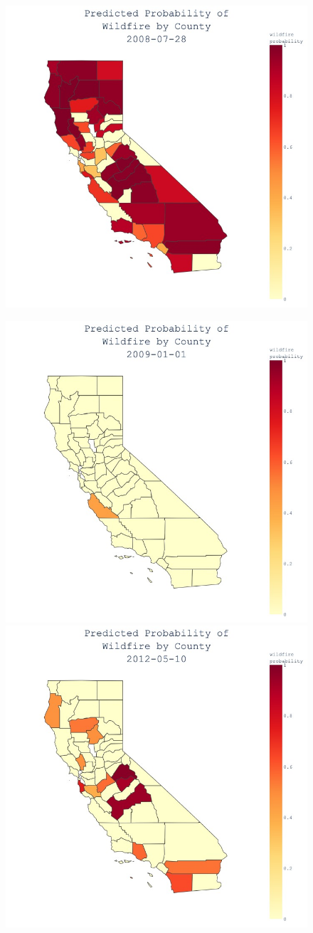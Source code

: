 \documentclass{article}
\begin{document}
\begin{figure}[h!]
	\includegraphics[width=.75\linewidth]{images/animGraph_0189.jpg}
\end{figure}
\begin{figure}[h!]
	\includegraphics[width=.5\linewidth]{images/animGraph_0346.jpg}
	\includegraphics[width=.5\linewidth]{images/animGraph_1571.jpg}
\end{figure}
\end{document}
